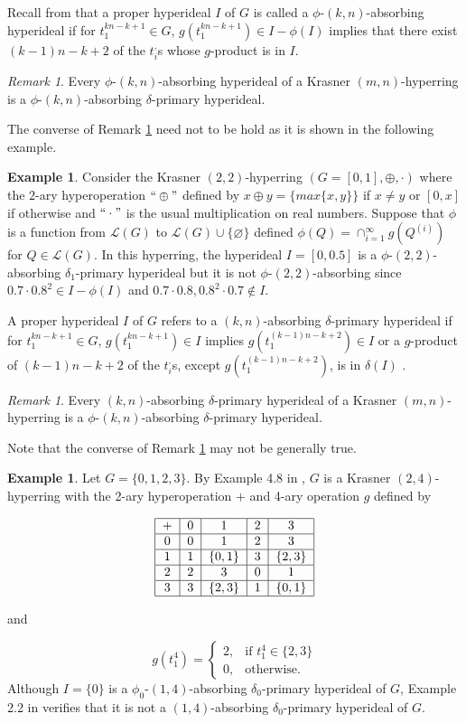 \documentclass[preprint,review,10pt]{amsart}
\theoremstyle{definition}
\newtheorem{example}[theorem]{Example}
\theoremstyle{remark}
\newtheorem{remark}[theorem]{Remark}
\numberwithin{equation}{section}
\begin{document}
Recall from \cite{mah6} that a proper hyperideal $I$ of $G$ is called a $\phi$-$(k,n)$-absorbing hyperideal  if for  $t_1^{kn-k+1} \in G$, $g(t_1^{kn-k+1}) \in I-\phi(I)$ implies that there exist $(k-1)n-k+2$ of the $t_i^,$s whose $g$-product is in $I$. 
\begin{remark} \label{e1}
Every $\phi$-$(k,n)$-absorbing hyperideal of a Krasner $(m,n)$-hyperring is  a $\phi$-$(k,n)$-absorbing $\delta$-primary hyperideal.
\end{remark} 
The converse of Remark \ref{e1} need not to be hold  as it is shown in the following example. 
\begin{example} \label{exa2}
Consider the Krasner $(2,2)$-hyperring  $(G=[0,1],\oplus,\cdot)$ where the  $2$-ary hyperoperation  $``\oplus"$ defined by $x \oplus y=\{max\{x, y\}\}$ if $x \neq y$ or $[0,x]$ if otherwise and  $``\cdot"$
  is the usual multiplication on real numbers. Suppose  that   $\phi$ is  a function from $\mathcal{L}(G)$ to $\mathcal{L}(G) \cup \{\varnothing\}$ defined $\phi(Q)=\cap_{i=1}^{\infty} g(Q^{(i)})$ for  $Q \in \mathcal{L}(G)$. In this hyperring,  the hyperideal $I=[0,0.5]$ is a  $\phi$-$(2,2)$-absorbing $\delta_1$-primary hyperideal but it is not $\phi$-$(2,2)$-absorbing since $ 0.7 \cdot 0.8^2 \in I-\phi(I)$ and $ 0.7 \cdot 0.8, 0.8^2 \cdot 0.7 \notin I$.
\end{example}
 A proper hyperideal $I$ of $G$ refers to a $(k,n)$-absorbing $\delta$-primary hyperideal  if for  $t_1^{kn-k+1} \in G$, $g(t_1^{kn-k+1}) \in I$ implies $g(t_1^{(k-1)n-k+2}) \in I$ or a $g$-product of $(k-1)n-k+2$ of the $t_i^,$s, except $g(t_1^{(k-1)n-k+2})$, is in $\delta(I)$ \cite{mah7}.
\begin{remark} \label{e2}
Every $(k,n)$-absorbing $\delta$-primary hyperideal of a Krasner $(m,n)$-hyperring is  a $\phi$-$(k,n)$-absorbing $\delta$-primary hyperideal.
\end{remark} 
Note that the converse of Remark \ref{e2} may not be generally
true. 
\begin{example} \label{e22}
Let $G=\{0,1,2,3\}$. By Example 4.8 in  \cite{sorc1}, $G$ is a Krasner $(2,4)$-hyperring with the 2-ary hyperoperation  $+$ and 4-ary operation $g$ deﬁned by 


\[\begin{tabular}{|c|c|c|c|c|} 
\hline $+$ & $0$ & $1$ & $2$ & $3$
\\ \hline  $0$ & $0$ & $1$ & $2$ & $3$
\\ \hline $1$ & $1$ & $\{0,1\}$ &  $3$ & $\{2,3\}$
\\ \hline $2$ & $2$ & $3$ & $0$ & $1$ 
\\ \hline $3$ & $3$ & $\{2,3\}$ &  $1$ & $\{0,1\}$
\\ \hline
\end{tabular}\]

and

\[ 
g(t_1^4)=
\begin{cases}
2, & \text{if $t_1^4 \in \{2,3\}$}\\
0, & \text{otherwise.}
\end{cases} \]
Although $I=\{0\}$ is a $\phi_0$-$(1,4)$-absorbing $\delta_0$-primary hyperideal of $G$, Example 2.2 in \cite{weak} verifies that it is not a $(1,4)$-absorbing $\delta_0$-primary hyperideal of $G$.
\end{example}
\end{document}
